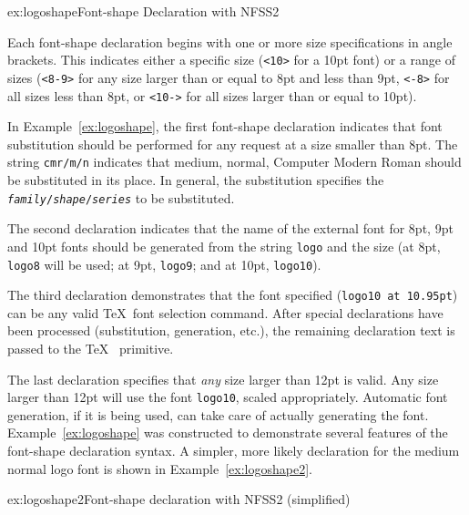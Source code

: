 \begin{example}{ex:logoshape}{Font-shape Declaration with NFSS2}
\end{example}

Each font-shape declaration begins with one or more 
size specifications in
angle brackets.  This indicates either a specific size (\verb|<10>| for a 10pt
font) or a range of sizes (\verb|<8-9>| for any size larger than or equal to
8pt and less than 9pt, \verb|<-8>| for all sizes less than 8pt, or
\verb|<10->| for all sizes larger than or equal to 10pt).  

In Example~\ref{ex:logoshape}, the first font-shape declaration indicates that
font substitution should be performed for any request at a size
smaller than 8pt.  The string \texttt{cmr/m/n} indicates that medium, normal,
Computer Modern Roman should be substituted in its place.  In general, the
substitution specifies the
\texttt{\textit{family}/\textit{shape}/\textit{series}} to be substituted.

The second declaration indicates that the name of the external font for 8pt,
9pt and 10pt fonts should be generated from the string \texttt{logo}
and the size (at 8pt, \texttt{logo8} will be used; at 9pt,
\texttt{logo9}; and at 10pt, \texttt{logo10}).

The third declaration demonstrates that the font specified (\texttt{logo10 at
10.95pt}) can be any valid \TeX\ font selection command.  After special
declarations have been processed (substitution, generation, etc.), the
remaining declaration text is passed to the \TeX\  primitive.

The last declaration specifies that \textit{any} size larger than 12pt is
valid.  Any size larger than 12pt will use the font \texttt{logo10}, scaled
appropriately.  Automatic font generation, if it is being used, can take care 
of actually generating the font.  Example~\ref{ex:logoshape} was constructed
to demonstrate several features of the font-shape declaration syntax.  A
simpler, more likely declaration for the medium normal logo font is
shown in Example~\ref{ex:logoshape2}.  

\begin{example}{ex:logoshape2}{Font-shape declaration with NFSS2 (simplified)}
\end{example}

